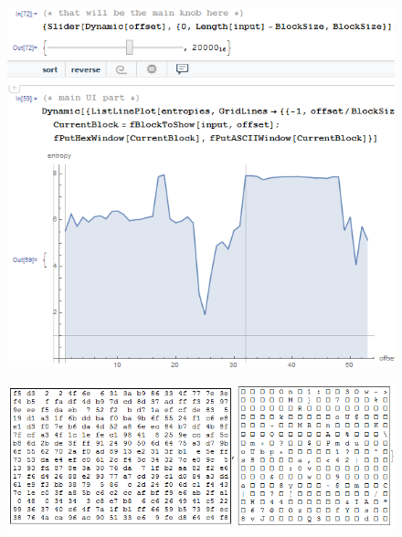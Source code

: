 \begin{figure}[H]
\centering
\includegraphics[width=\EntropyGfxScale]{ff/entropy/notepad21.png}
\end{figure}

\begin{figure}[H]
\centering
\includegraphics[width=\EntropyGfxScale]{ff/entropy/notepad22.png}
\end{figure}
